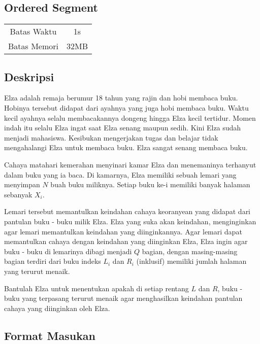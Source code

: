 \documentclass{article}
\begin{document}
\begin{center}
    \section*{Ordered Segment} %

    \begin{tabular}{ | c c | }
        \hline
        Batas Waktu  & 1s \\    %
        Batas Memori & 32MB \\  %
        \hline
    \end{tabular}
\end{center}

\subsection*{Deskripsi}

Elza adalah remaja berumur 18 tahun yang rajin dan hobi membaca buku.
Hobinya tersebut didapat dari ayahnya yang juga hobi membaca buku.
Waktu kecil ayahnya selalu membacakannya dongeng hingga Elza kecil tertidur.
Momen indah itu selalu Elza ingat saat Elza senang maupun sedih.
Kini Elza sudah menjadi mahasiswa.
Kesibukan mengerjakan tugas dan belajar tidak mengahalangi Elza untuk membaca buku.
Elza sangat senang membaca buku.

Cahaya matahari kemerahan menyinari kamar Elza dan menemaninya terhanyut dalam buku yang ia baca.
Di kamarnya, Elza memiliki sebuah lemari yang menyimpan $N$ buah buku miliknya. Setiap buku ke-i 
memiliki banyak halaman sebanyak $X_i$.

Lemari tersebut memantulkan keindahan cahaya keoranyean yang didapat dari pantulan buku - buku milik Elza.
Elza yang suka akan keindahan, menginginkan agar lemari memantulkan keindahan yang diinginkannya.
Agar lemari dapat memantulkan cahaya dengan keindahan yang diinginkan Elza,
Elza ingin agar buku - buku di lemarinya dibagi menjadi $Q$ bagian, dengan masing-masing bagian terdiri dari buku indeks
$L_i$ dan $R_i$ (inklusif) memiliki jumlah halaman yang terurut menaik.

Bantulah Elza untuk menentukan apakah di setiap rentang $L$ dan $R$, buku - buku yang terpasang terurut menaik agar menghasilkan keindahan pantulan cahaya yang diinginkan oleh Elza.

\subsection*{Format Masukan}
\end{document}

